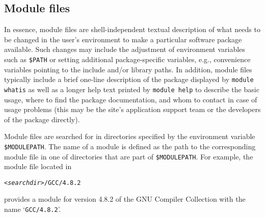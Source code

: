 %
%

\subsection{Module files}
\label{sec:Module_files}

In essence, module files are shell-independent textual description of
what needs to be changed in the user's environment to make a
particular software package available. Such changes may include the
adjustment of environment variables such as \texttt{\$PATH} or setting
additional package-specific variables, e.g., convenience
variables pointing to the include and/or library paths.  In addition,
module files typically include a brief one-line description of the
package displayed by \texttt{module whatis} as well as a longer help
text printed by \texttt{module help} to describe the basic usage,
where to find the package documentation, and whom to contact in case
of usage problems (this may be the site's application support team or
the developers of the package directly).

Module files are searched for in directories specified by the
environment variable \texttt{\$MODULEPATH}. The name of a module is defined
as the path to the corresponding module file in one of directories that are
part of \texttt{\$MODULEPATH}. For example, the module file located in
{\small
\begin{alltt}
    <\emph{searchdir}>/GCC/4.8.2
\end{alltt}
}
provides a module for version 4.8.2 of the GNU Compiler Collection with the
name `\texttt{GCC/4.8.2}'.

